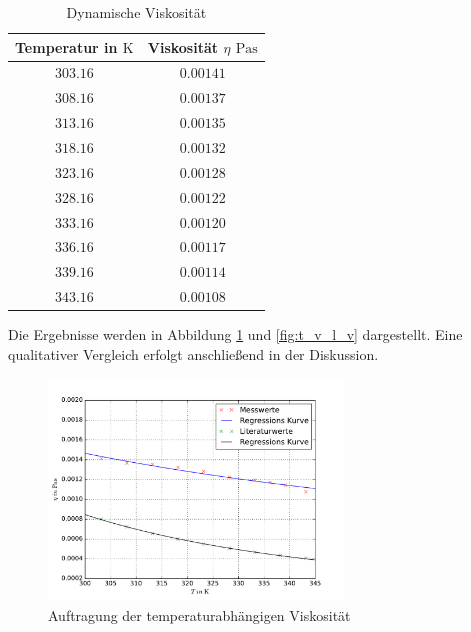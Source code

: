 \begin{table}
\centering
\begin{tabular} {cc}
  \toprule
  Temperatur in $\si{\kelvin}$ & Viskosität $\eta$ $\si{\pascal\second}$ \\
  \midrule
  $\num{303.16}$ & $\num{0.00141}$ \\
  $\num{308.16}$ & $\num{0.00137}$ \\
  $\num{313.16}$ & $\num{0.00135}$ \\
  $\num{318.16}$ & $\num{0.00132}$ \\
  $\num{323.16}$ & $\num{0.00128}$ \\
  $\num{328.16}$ & $\num{0.00122}$ \\
  $\num{333.16}$ & $\num{0.00120}$ \\
  $\num{336.16}$ & $\num{0.00117}$ \\
  $\num{339.16}$ & $\num{0.00114}$ \\
  $\num{343.16}$ & $\num{0.00108}$ \\
\bottomrule
\end{tabular}
\caption{Dynamische Viskosität} %
\label{tab:visko_wasser_temp}
\end{table}

Die Ergebnisse werden in Abbildung \ref{fig:t_v_v} und \ref{fig:t_v_l_v} dargestellt.  %
Eine qualitativer Vergleich erfolgt anschließend in der Diskussion. %

\FloatBarrier
\begin{figure}
\centering
\includegraphics[width=0.7\textwidth]{pics/viskositaet_temp_mit_lit.pdf}
\caption{Auftragung der temperaturabhängigen Viskosität} %
\label{fig:t_v_v}
\end{figure}

